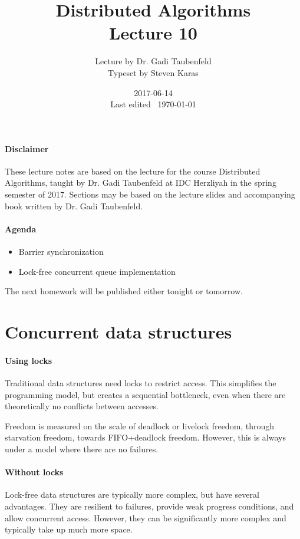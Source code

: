 \documentclass{idc_msc}
\title{Distributed Algorithms\\\large Lecture 10}
\date{2017-06-14 \\ Last edited \currenttime\ \today}
\author{Lecture by Dr. Gadi Taubenfeld\\Typeset by Steven Karas}
\begin{document}
\maketitle

\paragraph{Disclaimer}

These lecture notes are based on the lecture for the course Distributed Algorithms, taught by Dr. Gadi Taubenfeld at IDC Herzliyah in the spring semester of 2017.
Sections may be based on the lecture slides and accompanying book written by Dr. Gadi Taubenfeld.

\paragraph{Agenda}

\begin{itemize}
  \item Barrier synchronization
  \item Lock-free concurrent queue implementation
\end{itemize}

The next homework will be published either tonight or tomorrow.

\section{Concurrent data structures}

\paragraph{Using locks}
Traditional data structures need locks to restrict access.
This simplifies the programming model, but creates a sequential bottleneck, even when there are theoretically no conflicts between accesses.

Freedom is measured on the scale of deadlock or livelock freedom, through starvation freedom, towards FIFO+deadlock freedom.
However, this is always under a model where there are no failures.

\paragraph{Without locks}
Lock-free data structures are typically more complex, but have several advantages.
They are resilient to failures, provide weak progress conditions, and allow concurrent access.
However, they can be significantly more complex and typically take up much more space.
\end{document}
